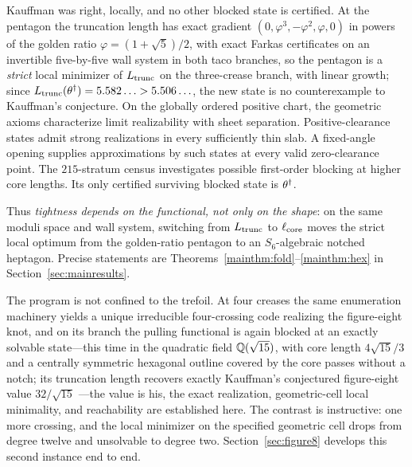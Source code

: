 Kauffman was right, locally, and no other blocked state is certified. At the pentagon the truncation length has exact gradient $(0,\varphi^3,-\varphi^2,\varphi,0)$ in powers of the golden ratio $\varphi=(1+\sqrt5)/2$, with exact Farkas certificates on an invertible five-by-five wall system in both taco branches, so the pentagon is a \emph{strict} local minimizer of $L_{\mathrm{trunc}}$ on the three-crease branch, with linear growth; since $L_{\mathrm{trunc}}(\theta^\dagger)=5.582\ldots>5.506\ldots$, the new state is no counterexample to Kauffman's conjecture. On the globally ordered positive chart, the geometric axioms characterize limit realizability with sheet separation. Positive-clearance states admit strong realizations in every sufficiently thin slab. A fixed-angle opening supplies approximations by such states at every valid zero-clearance point. The $215$-stratum census investigates possible first-order blocking at higher core lengths. Its only certified surviving blocked state is $\theta^\dagger$.

Thus \emph{tightness depends on the functional, not only on the shape}: on the same moduli space and wall system, switching from $L_{\mathrm{trunc}}$ to $\ell_{\mathrm{core}}$ moves the strict local optimum from the golden-ratio pentagon to an $S_6$-algebraic notched heptagon. Precise statements are Theorems~\ref{mainthm:fold}--\ref{mainthm:hex} in Section~\ref{sec:mainresults}.

The program is not confined to the trefoil. At four creases the same enumeration machinery yields a unique irreducible four-crossing code realizing the figure-eight knot, and on its branch the pulling functional is again blocked at an exactly solvable state---this time in the quadratic field $\mathbb{Q}(\sqrt{15})$, with core length $4\sqrt{15}/3$ and a centrally symmetric hexagonal outline covered by the core passes without a notch; its truncation length recovers exactly Kauffman's conjectured figure-eight value $32/\sqrt{15}$ \cite{kauffman2004}---the value is his, the exact realization, geometric-cell local minimality, and reachability are established here. The contrast is instructive: one more crossing, and the local minimizer on the specified geometric cell drops from degree twelve and unsolvable to degree two. Section~\ref{sec:figure8} develops this second instance end to end.

